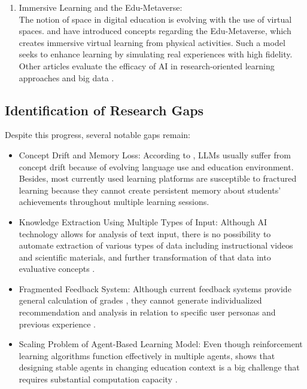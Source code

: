 \begin{enumerate}
	\item Immersive Learning and the Edu-Metaverse: \\
	The notion of space in digital education is evolving with the use of virtual spaces. \textcite{illi2025} and \textcite{teichmann2025} have introduced concepts regarding the Edu-Metaverse, which creates immersive virtual learning from physical activities. Such a model seeks to enhance learning by simulating real experiences with high fidelity. Other articles evaluate the efficacy of AI in research-oriented learning approaches \cite{festiyed2026} and big data \cite{bakhouyi2025}.
\end{enumerate}



\subsection{Identification of Research Gaps}

Despite this progress, several notable gaps remain:

\begin{itemize}
    \item Concept Drift and Memory Loss: According to \textcite{hajmohammed2025}, LLMs usually suffer from concept drift because of evolving language use and education environment. Besides, most currently used learning platforms are susceptible to fractured learning because they cannot create persistent memory about students’ achievements throughout multiple learning sessions.
    \item Knowledge Extraction Using Multiple Types of Input: Although AI technology allows for analysis of text input, there is no possibility to automate extraction of various types of data including instructional videos and scientific materials, and further transformation of that data into evaluative concepts \cite{pradeesh2025, lopez2025}.
    \item Fragmented Feedback System: Although current feedback systems provide general calculation of grades \cite{mallik2023}, they cannot generate individualized recommendation and analysis in relation to specific user personas and previous experience \cite{hasan2020}.
    \item Scaling Problem of Agent-Based Learning Model: Even though reinforcement learning algorithms function effectively in multiple agents, \textcite{nguyen2020} shows that designing stable agents in changing education context is a big challenge that requires substantial computation capacity \cite{boldo2024}.
\end{itemize}

